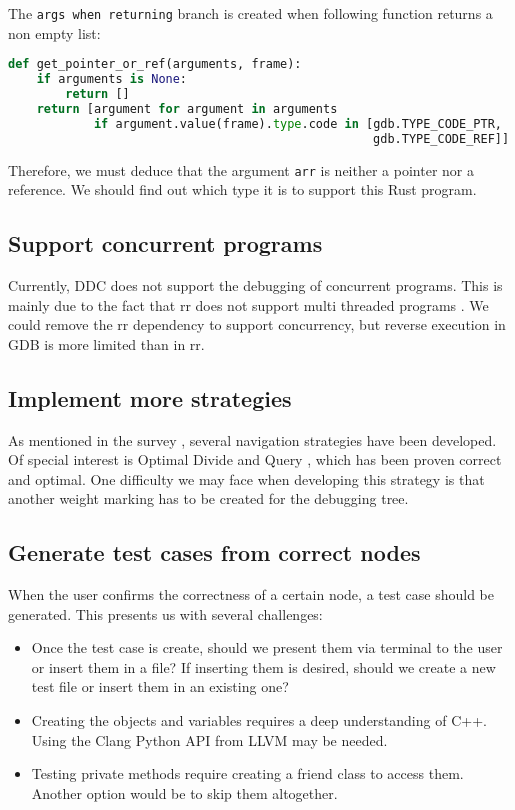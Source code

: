 The \verb|args when returning| branch is created when following function returns a non empty list:
\begin{lstlisting}[language=Python, caption=Python function, frame=tb]
def get_pointer_or_ref(arguments, frame):
    if arguments is None:
        return []
    return [argument for argument in arguments
            if argument.value(frame).type.code in [gdb.TYPE_CODE_PTR,
                                                   gdb.TYPE_CODE_REF]]
\end{lstlisting}
Therefore, we must deduce that the argument \verb|arr| is neither a pointer nor a reference. We should find out which type it is to support this Rust program.
\subsection{Support concurrent programs}
Currently, DDC does not support the debugging of concurrent programs.
This is mainly due to the fact that rr does not support multi threaded programs \cite{rr}.
We could remove the rr dependency to support concurrency, but reverse execution in GDB \cite{ReverseExecution_GDB} is more limited than in rr.
\subsection{Implement more strategies}
As mentioned in the survey \cite{Survey}, several navigation strategies have been developed.
Of special interest is Optimal Divide and Query \cite{optimal_strategy}, which has been proven correct and optimal.
One difficulty we may face when developing this strategy is that another weight marking has to be created for the debugging tree.
\subsection{Generate test cases from correct nodes}
When the user confirms the correctness of a certain node, a test case should be generated.
This presents us with several challenges:
\begin{itemize}
    \item Once the test case is create, should we present them via terminal to the user or insert them in a file? If inserting them is desired, should we create a new test file or insert them in an existing one?
    \item Creating the objects and variables requires a deep understanding of C++. Using the Clang Python API from LLVM \cite{llvm} may be needed.
    \item Testing private methods require creating a friend class to access them. Another option would be to skip them altogether.
\end{itemize}


